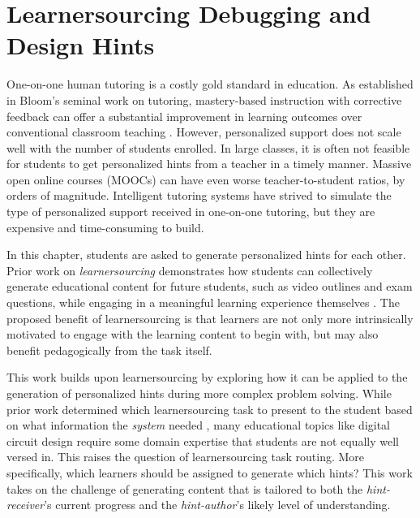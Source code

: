 \chapter{Learnersourcing Debugging and Design Hints}\label{chapter:classoverflow}

One-on-one human tutoring is a costly gold standard in education. As established in Bloom's seminal work on tutoring, mastery-based instruction with corrective feedback can offer a substantial improvement in learning outcomes over conventional classroom teaching \cite{bloom}. However, personalized support does not scale well with the number of students enrolled. In large classes, it is often not feasible for students to get personalized hints from a teacher in a timely manner. Massive open online courses (MOOCs) can have even worse teacher-to-student ratios, by orders of magnitude. Intelligent tutoring systems have strived to simulate the type of personalized support received in one-on-one tutoring, but they are expensive and time-consuming to build. 

In this chapter, students are asked to generate personalized hints for each other. Prior work on \textit{learnersourcing} demonstrates how students can collectively generate educational content for future students, such as video outlines and exam questions, while engaging in a meaningful learning experience themselves \cite{kim2013learnersourcing,weir2015,mitros2015}. The proposed benefit of learnersourcing is that learners are not only more intrinsically motivated to engage with the learning content to begin with, but may also benefit pedagogically from the task itself.

This work builds upon learnersourcing by exploring how it can be applied to the generation of personalized hints during more complex problem solving. While prior work determined which learnersourcing task to present to the student based on what information the {\it system} needed \cite{weir2015}, many educational topics like digital circuit design require some domain expertise that students are not equally well versed in. This raises the question of learnersourcing task routing. More specifically, which learners should be assigned to generate which hints? This work takes on the challenge of generating content that is tailored to both the \textit{hint-receiver}'s current progress and the \textit{hint-author}'s likely level of understanding. 

